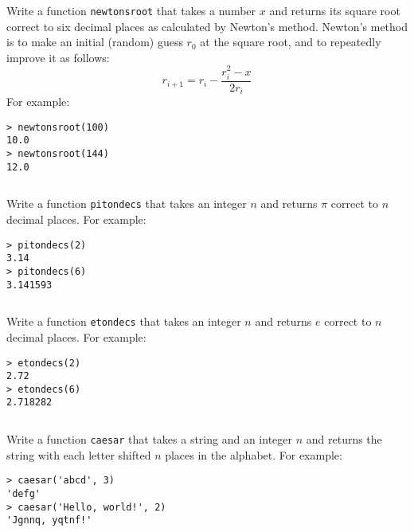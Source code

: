\documentclass{iansproblems}
\begin{document}
\begin{questions}
\begin{solution}
  \inputminted{python}{solutions/compoundinterest.py}
\end{solution}


\question
Write a function \texttt{newtonsroot} that takes a number \( x \) and returns its square root correct to six decimal places as calculated by Newton's method.
Newton's method is to make an initial (random) guess \( r_0 \) at the square root, and to repeatedly improve it as follows:
\[ r_{i+1} = r_i - \frac{r_i^2 - x}{2 r_i} \]
For example:
\begin{verbatim}
> newtonsroot(100)
10.0
> newtonsroot(144)
12.0
\end{verbatim}

\begin{solution}
  \inputminted{python}{solutions/newtonsroot.py}
\end{solution}


\question
Write a function \texttt{pitondecs} that takes an integer \( n \) and returns \( \pi \) correct to \( n \) decimal places.
For example:
\begin{verbatim}
> pitondecs(2)
3.14
> pitondecs(6)
3.141593
\end{verbatim}

\begin{solution}
  \inputminted{python}{solutions/pitondecs.py}
\end{solution}


\question
Write a function \texttt{etondecs} that takes an integer \( n \) and returns \( e \) correct to \( n \) decimal places.
For example:
\begin{verbatim}
> etondecs(2)
2.72
> etondecs(6)
2.718282
\end{verbatim}

\begin{solution}
  \inputminted{python}{solutions/etondecs.py}
\end{solution}

\question
Write a function \texttt{caesar} that takes a string and an integer $n$ and returns the string with each letter shifted $n$ places in the alphabet.
For example:
\begin{verbatim}
> caesar('abcd', 3)
'defg'
> caesar('Hello, world!', 2)
'Jgnnq, yqtnf!'
\end{verbatim}
 
\begin{solution}
  \inputminted{python}{solutions/caesar.py}
\end{solution}



\end{questions}
\end{document}
